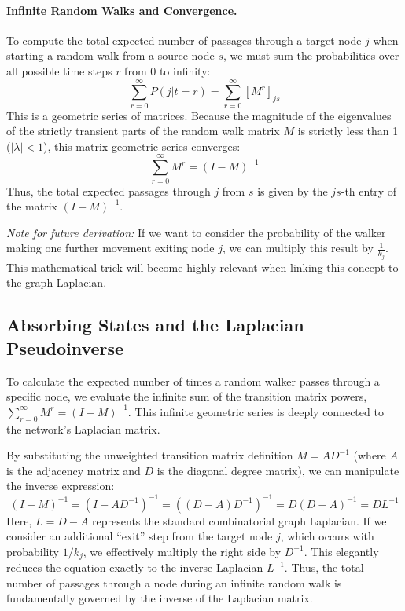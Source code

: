 \paragraph{Infinite Random Walks and Convergence.}
To compute the total expected number of passages through a target node $j$ when starting a random walk from a source node $s$, we must sum the probabilities over all possible time steps $r$ from $0$ to infinity:
\[
    \sum_{r=0}^{\infty} P(j | t=r) = \sum_{r=0}^{\infty} [M^r]_{js}
\]
This is a geometric series of matrices. Because the magnitude of the eigenvalues of the strictly transient parts of the random walk matrix $M$ is strictly less than 1 ($|\lambda| < 1$), this matrix geometric series converges:
\[
    \sum_{r=0}^{\infty} M^r = (I - M)^{-1}
\]
Thus, the total expected passages through $j$ from $s$ is given by the $js$-th entry of the matrix $(I - M)^{-1}$.

\textit{Note for future derivation:} If we want to consider the probability of the walker making one further movement exiting node $j$, we can multiply this result by $\frac{1}{k_j}$. This mathematical trick will become highly relevant when linking this concept to the graph Laplacian.

\subsection{Absorbing States and the Laplacian Pseudoinverse}

To calculate the expected number of times a random walker passes through a specific node, we evaluate the infinite sum of the transition matrix powers, $\sum_{r=0}^{\infty} M^r = (I - M)^{-1}$. This infinite geometric series is deeply connected to the network's Laplacian matrix.

By substituting the unweighted transition matrix definition $M = A D^{-1}$ (where $A$ is the adjacency matrix and $D$ is the diagonal degree matrix), we can manipulate the inverse expression:
\[
    (I - M)^{-1} = (I - A D^{-1})^{-1} = \left( (D - A)D^{-1} \right)^{-1} = D(D - A)^{-1} = D L^{-1}
\]
Here, $L = D - A$ represents the standard combinatorial graph Laplacian.
If we consider an additional ``exit'' step from the target node $j$, which occurs with probability $1/k_j$, we effectively multiply the right side by $D^{-1}$. This elegantly reduces the equation exactly to the inverse Laplacian $L^{-1}$. Thus, the total number of passages through a node during an infinite random walk is fundamentally governed by the inverse of the Laplacian matrix.

